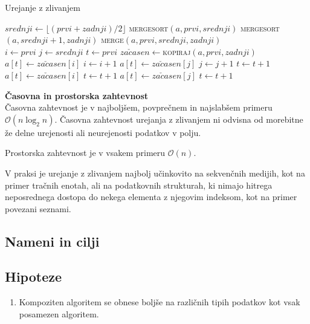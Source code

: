\documentclass[a4paper,oneside,12pt]{article}
\newcommand{\subsubsubsection}[1]{\vspace*{1ex}\textbf{#1}\\}
\begin{document}
\begin{algorithm}
  \caption{Urejanje z zlivanjem}\label{algo:mergesort}
  \begin{algorithmic}[1]
         \Return \EndIf
        \State $srednji \gets \lfloor(prvi + zadnji) / 2\rfloor$
        \State \textsc{mergesort}$(a, prvi, srednji)$
        \State \textsc{mergesort}$(a, srednji + 1, zadnji)$
        \State \textsc{merge}$(a, prvi, srednji, zadnji)$
    \EndFunction
    \\
        \State $i \gets prvi$
        \State $j \gets srednji$
        \State $t \gets prvi$
        \State $za\check{c}asen \gets$\textsc{kopiraj}$(a, prvi, zadnji)$ 
                \State $a[t] \gets za\check{c}asen[i]$
                \State $i \gets i + 1$
            \Else
                \State $a[t] \gets za\check{c}asen[j]$
                \State $j \gets j + 1$
            \EndIf
            \State $t \gets t + 1$
        \EndWhile
            \State $a[t] \gets za\check{c}asen[i]$
            \State $t \gets t + 1$
        \EndWhile
            \State $a[t] \gets za\check{c}asen[j]$
            \State $t \gets t + 1$
        \EndWhile
    \EndFunction
  \end{algorithmic}
\end{algorithm}

\subsubsubsection{Časovna in prostorska zahtevnost}
Časovna zahtevnost je v najboljšem, povprečnem in najslabšem primeru 
$\mathcal{O}(n\log_2 n)$. Časovna zahtevnost urejanja z zlivanjem ni odvisna od
morebitne že delne urejenosti ali neurejenosti podatkov v polju. 

Prostorska zahtevnost je v vsakem primeru $\mathcal{O}(n)$. %

V praksi je urejanje z zlivanjem najbolj učinkovito na
sekvenčnih medijih, kot na primer tračnih enotah, ali na podatkovnih strukturah, ki nimajo hitrega
neposrednega dostopa do nekega elementa z njegovim indeksom, kot na primer povezani seznami.

\subsection{Nameni in cilji}
\subsection{Hipoteze}
\begin{enumerate}
  \item Kompoziten algoritem se obnese boljše na različnih tipih podatkov kot vsak
    posamezen algoritem.
\end{enumerate}
\end{document}
